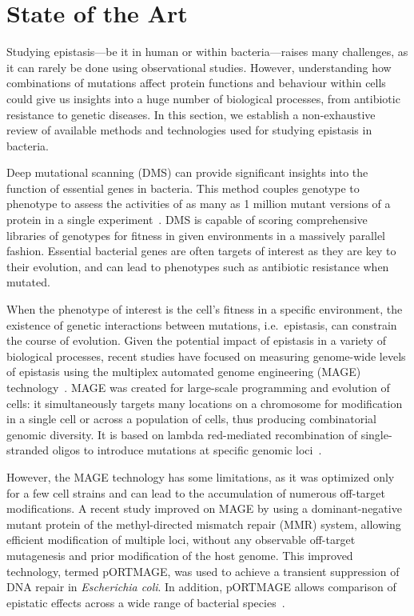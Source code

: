 \documentclass[12pt]{article}
\begin{document}
  \section*{State of the Art}

  Studying epistasis---be it in human or within bacteria---raises many
  challenges, as it can rarely be done using observational studies. However,
  understanding how combinations of mutations affect protein functions and
  behaviour within cells could give us insights into a huge number of
  biological processes, from antibiotic resistance to genetic diseases. In this
  section, we establish a non-exhaustive review of available methods and
  technologies used for studying epistasis in bacteria.

  Deep mutational scanning (DMS) can provide significant insights into the
  function of essential genes in bacteria. This method couples genotype to
  phenotype to assess the activities of as many as 1 million mutant versions of
  a protein in a single experiment~\cite{fowler2014deep}. DMS is capable of
  scoring comprehensive libraries of genotypes for fitness in given
  environments in a massively parallel fashion. Essential bacterial genes are
  often targets of interest as they are key to their evolution, and can lead to
  phenotypes such as antibiotic resistance when mutated. 

  When the phenotype of interest is the cell's fitness in a specific
  environment, the existence of genetic interactions between mutations, i.e.\
  epistasis, can constrain the course of evolution. Given the potential impact
  of epistasis in a variety of biological processes, recent studies have
  focused on measuring genome-wide levels of epistasis using the multiplex
  automated genome engineering (MAGE) technology~\cite{wang2012}. MAGE was
  created for large-scale programming and evolution of cells: it simultaneously
  targets many locations on a chromosome for modification in a single cell or
  across a population of cells, thus producing combinatorial genomic diversity.
  It is based on lambda red-mediated recombination of single-stranded oligos to
  introduce mutations at specific genomic loci~\cite{wang2009programming}.

  However, the MAGE technology has some limitations, as it was optimized only
  for a few cell strains and can lead to the accumulation of numerous
  off-target modifications. A recent study improved on MAGE by using a
  dominant-negative mutant protein of the methyl-directed mismatch repair (MMR)
  system, allowing efficient modification of multiple loci, without
  any observable off-target mutagenesis and prior modification of the host
  genome. This improved technology, termed pORTMAGE, was used to achieve a
  transient suppression of DNA repair in \textit{Escherichia coli}. In
  addition, pORTMAGE allows comparison of epistatic effects across a wide range
  of bacterial species~\cite{nyerges2016highly}.
\end{document}

